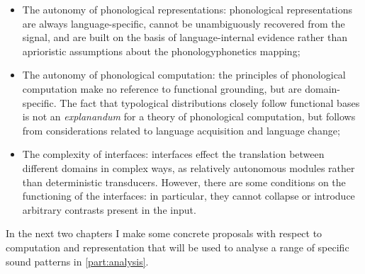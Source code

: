 \begin{itemize}
\item The autonomy of phonological representations: phonological representations are always language\hyp specific, cannot be unambiguously recovered from the signal, and are built on the basis of language\hyp internal evidence rather than aprioristic assumptions about the phonology\endash phonetics mapping;
\item The autonomy of phonological computation: the principles of phonological computation make no reference to functional grounding, but are domain\hyp specific. The fact that typological distributions closely follow functional bases is not an \emph{explanandum} for a theory of phonological computation, but follows from considerations related to language acquisition and language change;
\item The complexity of interfaces: interfaces effect the translation between different domains in complex ways, as relatively autonomous modules rather than deterministic transducers. However, there are some conditions on the functioning of the interfaces: in particular, they cannot collapse or introduce arbitrary contrasts present in the input.
\end{itemize}

In the next two chapters I make some concrete proposals with respect to computation and representation that will be used to analyse a range of specific sound patterns in \cref{part:analysis}.
